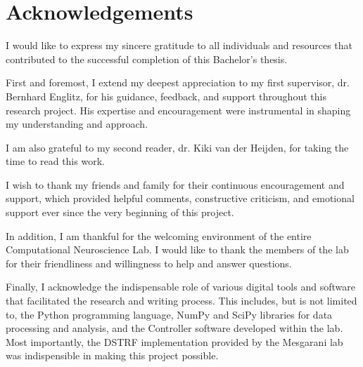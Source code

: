 \chapter*{Acknowledgements}\label{acknowledgements}
I would like to express my sincere gratitude to all individuals and resources that contributed to the successful completion of this Bachelor's thesis.

First and foremost, I extend my deepest appreciation to my first supervisor, dr. Bernhard Englitz, for his guidance, feedback, and support throughout this research project. His expertise and encouragement were instrumental in shaping my understanding and approach.

I am also grateful to my second reader, dr. Kiki van der Heijden, for taking the time to read this work.

I wish to thank my friends and family for their continuous encouragement and support, which provided helpful comments, constructive criticism, and emotional support ever since the very beginning of this project.

In addition, I am thankful for the welcoming environment of the entire Computational Neuroscience Lab. I would like to thank the members of the lab for their friendliness and willingness to help and answer questions.

Finally, I acknowledge the indispensable role of various digital tools and software that facilitated the research and writing process. This includes, but is not limited to, the Python programming language, NumPy and SciPy libraries for data processing and analysis, and the Controller software developed within the lab. Most importantly, the DSTRF implementation provided by the Mesgarani lab was indispensible in making this project possible.